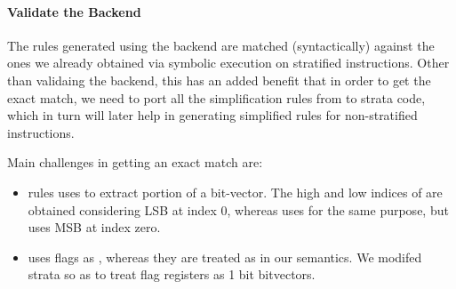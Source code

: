 {\paragraph{Validate the Backend}

The \K rules generated using the backend are matched (syntactically)  against
the ones we already obtained via symbolic execution on stratified instructions.
Other than validaing the backend, this has an added benefit that in order to get
the exact match, we need to port all the simplification rules from \K to strata
code, which in turn will later help in generating simplified \K rules for
non-stratified instructions. 

Main challenges in getting an exact match are:
\begin{itemize}

\item  \Strata rules uses \extract to extract portion of a bit-vector. The high
and low indices of \extract are obtained considering LSB at index 0, whereas \K
uses \extractMInt for the same purpose, but uses MSB at index zero.

\item  \Strata uses flags as \bool, whereas they are treated as \bv in our
semantics. We modifed strata so as to treat flag registers as 1 bit bitvectors.

\end{itemize}

}
